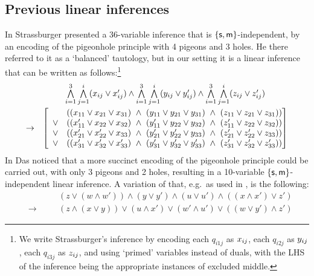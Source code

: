 \documentclass[a4paper, UKenglish, cleveref]{lipics-v2019}
\begin{document}
\subsection{Previous linear inferences}
\label{sec:prev-lin-infs}
In \cite{Str12:ext-wo-cut} Strassburger presented a 36-variable inference that is $\{\mathsf{s},\mathsf{m}\}$-independent, by an encoding of the pigeonhole principle with 4 pigeons and 3 holes.
He there referred to it as a `balanced' tautology, but in our setting it is a linear inference that can be written as follows:\footnote{We write Strassburger's inference by encoding each $q_{i1j}$ as $x_{ij} $, each $q_{i2j}$ as $y_{ij} $, each $q_{i3j}$ as $z_{ij} $, and using `primed' variables instead of duals, with the LHS of the inference being the appropriate instances of excluded middle.}
\[
\begin{array}{rc}
& \bigwedge\limits_{i=1}^3 \bigwedge\limits_{j=1}^i (\pp i j \lor \pp i j ' )
\land
\bigwedge\limits_{i=1}^3 \bigwedge\limits_{j=1}^i (\qq i j \lor \qq i j ' )
\land
\bigwedge\limits_{i=1}^3 \bigwedge\limits_{j=1}^i (\rr i j \lor \rr i j ' )
\\
\noalign{\smallskip}
\to &
\left[
\begin{array}{r@{\quad ( (}l@{)\ \land \ (}l@{)\ \land \ (}l@{))}}
	 & \pp 1 1  \lor \pp 2 1  \lor \pp 3 1   & \qq 1 1 \lor \qq 2 1 \lor \qq 3 1  & \rr 1 1 \lor \rr 2 1 \lor \rr 3 1  \\
\lor  & \pp 1 1 ' \lor \pp 2 2 \lor \pp 3 2 & \qq 1 1 ' \lor \qq 2 2 \lor \qq 3 2 & \rr 1 1 ' \lor \rr 2 2 \lor \rr 3 2 \\
\lor & \pp 2 1 ' \lor \pp 2 2 ' \lor \pp 3 3 & \qq 2 1 ' \lor \qq 2 2 ' \lor \qq 3 3 & \rr 2 1 ' \lor \rr 2 2 ' \lor \rr 3 3 \\
\lor  & \pp 3 1 ' \lor \pp 3 2 ' \lor \pp 3 3 ' & \qq 3 1 ' \lor \qq 3 2 ' \lor \qq 3 3 ' & \rr 3 1 ' \lor \rr 3 2 ' \lor \rr 3 3 '
\end{array}
\right]
\end{array}
\]
In \cite{Das13:lin-inf-rew} Das noticed that a more succinct encoding of the pigeonhole principle could be carried out, with only 3 pigeons and 2 holes, resulting in a 10-variable $\{\mathsf{s},\mathsf{m} \}$-independent linear inference.
A variation of that, e.g.\ as used in \cite{Das17:unavoidable-con-loop}, is the following:
\begin{equation}
\label{eq:10varinf-nonminimal}
\begin{alignedat}{2}
&&& (z \lor (w \land w')) \land (y \lor y') \land (u \lor u') \land ((x \land x') \lor z') \\
&\to &\quad& (z \land (x \lor y)) \lor (u \land x') \lor (w' \land u') \lor ((w \lor y') \land z')
\end{alignedat}
\end{equation}
\end{document}
